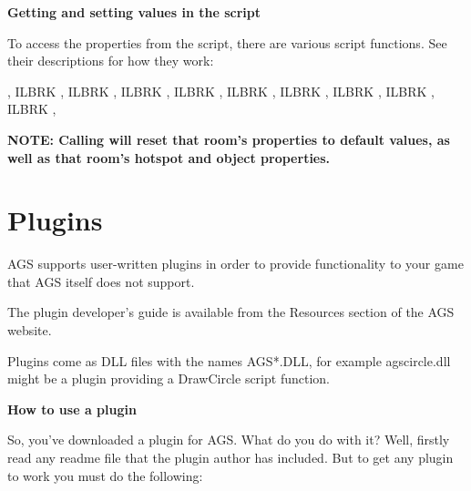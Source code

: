 \bf{Getting and setting values in the script}

To access the properties from the script, there are various script functions. See
their descriptions for how they work:

,  ILBRK
,  ILBRK
,  ILBRK
,  ILBRK
,  ILBRK
,  ILBRK
,  ILBRK
,  ILBRK
,  ILBRK
,  

\bf{NOTE:} Calling  will reset that room's properties to default values, as well as that room's
hotspot and object properties.

\section{Plugins}%

AGS supports user-written plugins in order to provide functionality to your game
that AGS itself does not support.

The plugin developer's guide is available from the Resources section of the AGS website.

Plugins come as DLL files with the names  AGS*.DLL, for example  agscircle.dll  might be a
plugin providing a DrawCircle script function.

\bf{How to use a plugin}

So, you've downloaded a plugin for AGS. What do you do with it?
Well, firstly read any readme file that the plugin author has included. But to get
any plugin to work you must do the following:

